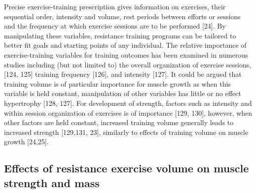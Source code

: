 \documentclass[twoside,10pt]{gihclass} %
\begin{document}
Precise exercise-training prescription gives information on exercises, their sequential order, intensity and volume, rest periods between efforts or sessions and the frequency at which exercise sessions are to be performed
{[}24{]}.
By manipulating these variables, resistance training programs can be tailored to better fit goals and starting points of any individual.
The relative importance of exercise-training variables for training outcomes has been examined in numerous studies including (but not limited to) the overall organization of exercise sessions,
{[}124, 125{]}
training frequency
{[}126{]},
and intensity
{[}127{]}.
It could be argued that training volume is of particular importance for muscle growth as when this variable is held constant, manipulation of other variables has little or no effect hypertrophy
{[}128, 127{]}.
For development of strength, factors such as intensity and within session organization of exercises is of importance
{[}129, 130{]},
however, when other factors are held constant, increased training volume generally leads to increased strength
{[}129,131, 23{]},
similarly to effects of training volume on muscle growth
{[}24,25{]}.

\hypertarget{effects-of-resistance-exercise-volume-on-muscle-strength-and-mass}{%
\subsection{Effects of resistance exercise volume on muscle strength and mass}\label{effects-of-resistance-exercise-volume-on-muscle-strength-and-mass}}
\end{document}
